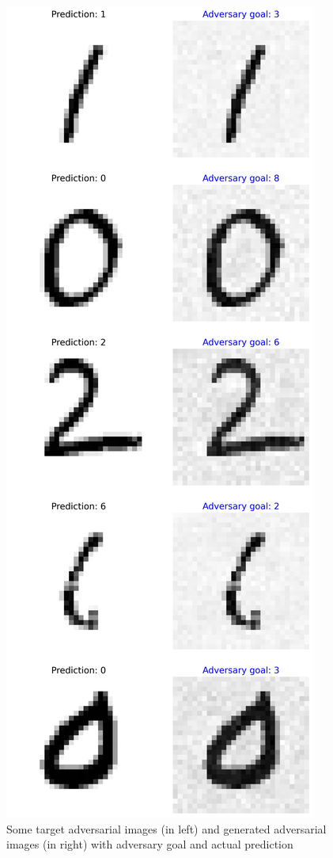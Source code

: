         \begin{figure}[htbp]
            \centering
            \includegraphics[width=\linewidth]{images/generated_adversarial_images.jpg}
            \caption{Some target adversarial images (in left) and generated adversarial images (in right) with adversary goal and actual prediction}
            \label{fig:adversarial_images}
        \end{figure}

